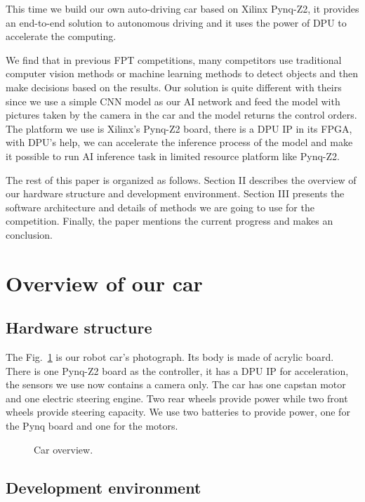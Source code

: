 \documentclass[conference]{IEEEtran}
\begin{document}
This time we build our own auto-driving car based on Xilinx Pynq-Z2, it provides an end-to-end solution to autonomous driving and it uses the power of DPU to accelerate the computing. 

We find that in previous FPT competitions, many competitors use traditional computer vision methods or machine learning methods to detect objects and then make decisions based on the results. Our solution is quite different with theirs since we use a simple CNN model as our AI network and feed the model with pictures taken by the camera in the car and the model returns the control orders.
The platform we use is Xilinx’s Pynq-Z2 board, there is a DPU IP in its FPGA, with DPU’s help, we can accelerate the inference process of the model and make it possible to run AI inference task in limited resource platform like Pynq-Z2.

The rest of this paper is organized as follows. Section II describes the overview of our hardware structure and development environment. Section III presents the software architecture and details of methods we are going to use for the competition. Finally, the paper mentions the current progress and makes an conclusion.

\section{Overview of our car}

\subsection{Hardware structure}

The Fig.~\ref{co} is our robot car's photograph. Its body is made of acrylic board. There is one Pynq-Z2 board as the controller, it has a DPU IP for acceleration, the sensors we use now contains a camera only. The car has one capstan motor and one electric steering engine. Two rear wheels provide power while two front wheels provide steering capacity. We use two batteries to provide power, one for the Pynq board and one for the motors.

\begin{figure}[htbp]
\caption{Car overview.}
\label{co}
\end{figure}

\subsection{Development environment}
\end{document}
